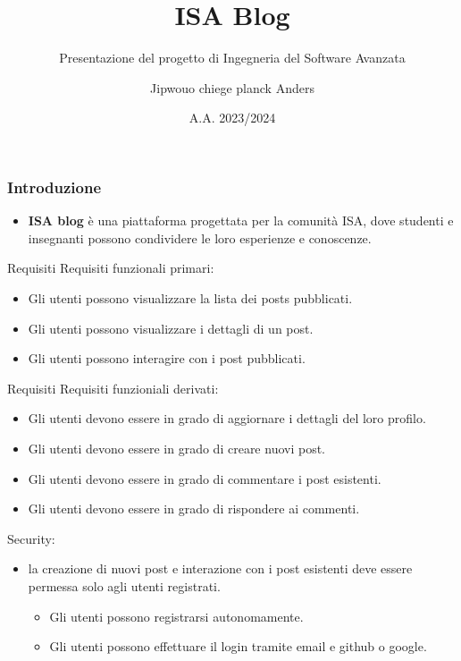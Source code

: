 \documentclass[8pt]{beamer}
\title{ISA Blog}
\subtitle{Presentazione del progetto di Ingegneria del Software Avanzata}
\author{Jipwouo chiege planck Anders}
\date{A.A. 2023/2024}
\begin{document}
\begin{frame}
    \titlepage
\end{frame}

\begin{frame}
    \frametitle{Introduzione}
    \begin{itemize}
        \item \textbf{ISA blog} è una piattaforma progettata per la comunità ISA,
        dove studenti e insegnanti possono condividere le loro esperienze e conoscenze.
    \end{itemize}
\end{frame}

\begin{frame}{Requisiti}
    Requisiti funzionali primari:
    \begin{itemize}
        \item Gli utenti possono visualizzare la lista dei posts pubblicati.
        \item Gli utenti possono visualizzare i dettagli di un post.
        \item Gli utenti possono interagire con i post pubblicati.
    \end{itemize}
\end{frame}

\begin{frame}{Requisiti}
    Requisiti funzioniali derivati:
    \begin{itemize}
        \item Gli utenti devono essere in grado di aggiornare i dettagli del loro profilo.
        \item Gli utenti devono essere in grado di creare nuovi post.
        \item Gli utenti devono essere in grado di commentare i post esistenti.
        \item Gli utenti devono essere in grado di rispondere ai commenti.
      \end{itemize}
    Security:
    \begin{itemize}
        \item la creazione di nuovi post e interazione con i post esistenti deve essere permessa solo agli utenti registrati.
              \begin{itemize}
                  \item Gli utenti possono registrarsi autonomamente.
                  \item Gli utenti possono effettuare il login tramite email e github o google.
              \end{itemize}
    \end{itemize}
\end{frame}
\end{document}

